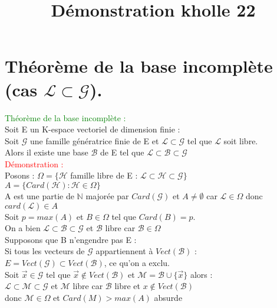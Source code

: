\documentclass{article}
\begin{document}
\title{Démonstration kholle 22}
\date{}
\maketitle
	\renewcommand{\thesection}{\Roman{section}}
	\setlength{\parindent}{1.5cm}
\section{Théorème de la base incomplète (cas $\mathcal L \subset \mathcal G$).}
\textcolor{green}{Théorème de la base incomplète :} \\
Soit  E un K-espace vectoriel de dimension finie : \\
Soit $ \mathcal G$ une famille génératrice finie de E et $\mathcal L \subset \mathcal G$ tel que $ \mathcal L$ soit libre. \\
Alors il existe une base $\mathcal B$ de E tel que $\mathcal L \subset \mathcal B \subset \mathcal G$ \\
\textcolor{red}{Démonstration :} \\
Posons : $\Omega= \lbrace \mathcal H$ famille libre de E : $ \mathcal L \subset \mathcal H \subset \mathcal G \rbrace$ \\
$A= \lbrace Card(\mathcal H) : \mathcal H \in \Omega \rbrace$ \\
A est une partie de $\mathbb N$ majorée par $Card(\mathcal G)$ et $A \neq \emptyset$ car $ \mathcal L \in \Omega $ donc $card(\mathcal L) \in A$ \\
Soit $p=max(A)$ et $B \in \Omega$ tel que $Card(B)=p$. \\
On a bien $\mathcal L \subset \mathcal B \subset \mathcal G$ et $\mathcal B$ libre car $\mathcal B \in \Omega$ \\
Supposons que B n'engendre pas E : \\
Si tous les vecteurs de $\mathcal G$ appartiennent à $Vect(\mathcal B)$ : \\
$E=Vect(\mathcal G) \subset Vect(\mathcal B)$, ce qu'on a exclu. \\
Soit $\vec x \in \mathcal G$ tel que $\vec x \notin Vect( \mathcal B )$ et $\mathcal M= \mathcal B \cup \lbrace \vec x \rbrace$ alors : \\
$\mathcal L \subset \mathcal M \subset \mathcal G$ et $ \mathcal M$ libre car $ \mathcal B$ libre et $x \notin Vect(\mathcal B)$ \\
donc $\mathcal M \in \Omega$ et $Card(M)>max(A)$ absurde
\end{document}
